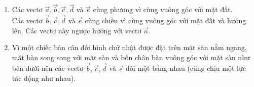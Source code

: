 \begin{bt}
{		\begin{enumerate}
			\item Các vectơ $\overrightarrow{a}, \overrightarrow{b}, \overrightarrow{c}, \overrightarrow{d}$ và $\overrightarrow{e}$ cùng phương vì cùng vuông góc với mặt đất.\\
			Các vectơ $\overrightarrow{b}, \overrightarrow{c}, \overrightarrow{d}$ và $\overrightarrow{e}$ cùng chiều vì cùng vuông góc với mặt đất và hướng lên. Các vectơ này ngược hướng với vectơ $\overrightarrow{a}$.
			\item 	Vì một chiếc bàn cân đối hình chữ nhật được đặt trên mặt sàn nằm ngang, mặt bàn song song với mặt sàn và bốn chân bàn vuông góc với mặt sàn như bên dưới nên các vectơ $\overrightarrow{b}, \overrightarrow{c}, \overrightarrow{d}$ và $\overrightarrow{e}$ đôi một bằng nhau (cùng chịu một lực tác động như nhau).
		\end{enumerate}
	}
\end{bt}

